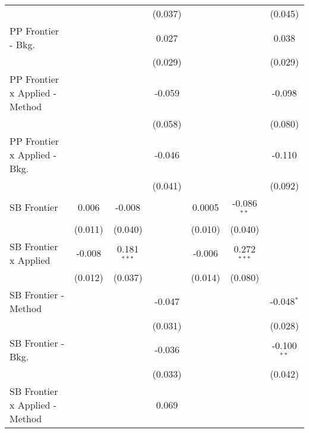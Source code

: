 \begin{tabular}{lcccccc}
                                  &                &               & (0.037)       &                &               & (0.045)\\   
   PP Frontier - Bkg.             &                &               & 0.027         &                &               & 0.038\\   
                                  &                &               & (0.029)       &                &               & (0.029)\\   
   PP Frontier x Applied - Method &                &               & -0.059        &                &               & -0.098\\   
                                  &                &               & (0.058)       &                &               & (0.080)\\   
   PP Frontier x Applied - Bkg.   &                &               & -0.046        &                &               & -0.110\\   
                                  &                &               & (0.041)       &                &               & (0.092)\\   
   SB Frontier                    & 0.006          & -0.008        &               & 0.0005         & -0.086$^{**}$ &   \\   
                                  & (0.011)        & (0.040)       &               & (0.010)        & (0.040)       &   \\   
   SB Frontier x Applied          & -0.008         & 0.181$^{***}$ &               & -0.006         & 0.272$^{***}$ &   \\   
                                  & (0.012)        & (0.037)       &               & (0.014)        & (0.080)       &   \\   
   SB Frontier - Method           &                &               & -0.047        &                &               & -0.048$^{*}$\\   
                                  &                &               & (0.031)       &                &               & (0.028)\\   
   SB Frontier - Bkg.             &                &               & -0.036        &                &               & -0.100$^{**}$\\   
                                  &                &               & (0.033)       &                &               & (0.042)\\   
   SB Frontier x Applied - Method &                &               & 0.069         &                &               &   \\   

\end{tabular}
